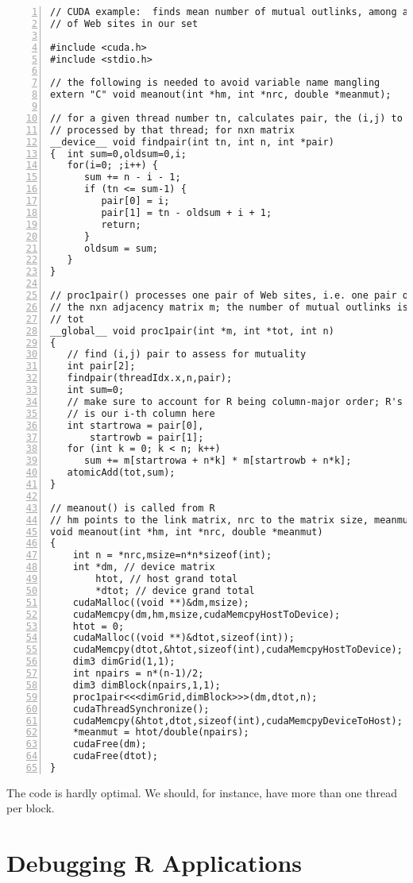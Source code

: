 \begin{lstlisting}[numbers=left]
// CUDA example:  finds mean number of mutual outlinks, among all pairs
// of Web sites in our set

#include <cuda.h>
#include <stdio.h>

// the following is needed to avoid variable name mangling
extern "C" void meanout(int *hm, int *nrc, double *meanmut);

// for a given thread number tn, calculates pair, the (i,j) to be
// processed by that thread; for nxn matrix
__device__ void findpair(int tn, int n, int *pair)
{  int sum=0,oldsum=0,i;
   for(i=0; ;i++) {
      sum += n - i - 1;
      if (tn <= sum-1) {
         pair[0] = i;
         pair[1] = tn - oldsum + i + 1;
         return;
      }
      oldsum = sum;
   }
}

// proc1pair() processes one pair of Web sites, i.e. one pair of rows in
// the nxn adjacency matrix m; the number of mutual outlinks is added to
// tot
__global__ void proc1pair(int *m, int *tot, int n)
{
   // find (i,j) pair to assess for mutuality
   int pair[2];
   findpair(threadIdx.x,n,pair);
   int sum=0;
   // make sure to account for R being column-major order; R's i-th row
   // is our i-th column here
   int startrowa = pair[0],
       startrowb = pair[1];
   for (int k = 0; k < n; k++)
      sum += m[startrowa + n*k] * m[startrowb + n*k];
   atomicAdd(tot,sum);
}

// meanout() is called from R
// hm points to the link matrix, nrc to the matrix size, meanmut to the output
void meanout(int *hm, int *nrc, double *meanmut)
{
    int n = *nrc,msize=n*n*sizeof(int);
    int *dm, // device matrix
        htot, // host grand total
        *dtot; // device grand total
    cudaMalloc((void **)&dm,msize);
    cudaMemcpy(dm,hm,msize,cudaMemcpyHostToDevice);
    htot = 0;
    cudaMalloc((void **)&dtot,sizeof(int));
    cudaMemcpy(dtot,&htot,sizeof(int),cudaMemcpyHostToDevice);
    dim3 dimGrid(1,1);
    int npairs = n*(n-1)/2;
    dim3 dimBlock(npairs,1,1);
    proc1pair<<<dimGrid,dimBlock>>>(dm,dtot,n);
    cudaThreadSynchronize();
    cudaMemcpy(&htot,dtot,sizeof(int),cudaMemcpyDeviceToHost);
    *meanmut = htot/double(npairs);
    cudaFree(dm);
    cudaFree(dtot);
}

\end{lstlisting}

The code is hardly optimal.  We should, for instance, have more than one
thread per block.

\section{Debugging R Applications}

